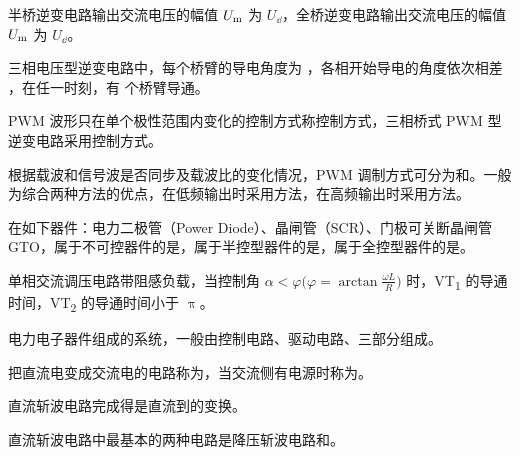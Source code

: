 \documentclass[电力电子]{subfiles}
\begin{document}
\begin{ti}
	半桥逆变电路输出交流电压的幅值 $U_{\text{m}}$ 为 $U_{\dd}$，全桥逆变电路输出交流电压的幅值 $U_{\text{m}}$ 为 $U_{\dd}$。
\end{ti}

\begin{ti}
	三相电压型逆变电路中，每个桥臂的导电角度为 ，各相开始导电的角度依次相差 ，在任一时刻，有  个桥臂导通。
\end{ti}

\begin{ti}
	PWM 波形只在单个极性范围内变化的控制方式称控制方式，三相桥式 PWM 型逆变电路采用控制方式。
\end{ti}

\begin{ti}
	根据载波和信号波是否同步及载波比的变化情况，PWM 调制方式可分为和。一般为综合两种方法的优点，在低频输出时采用方法，在高频输出时采用方法。
\end{ti}

\begin{ti}
	在如下器件：电力二极管（Power Diode）、晶闸管（SCR）、门极可关断晶闸管 GTO，属于不可控器件的是，属于半控型器件的是，属于全控型器件的是。
\end{ti}

\begin{ti}
	单相交流调压电路带阻感负载，当控制角 $\alpha < \varphi \bigl(\varphi = \arctan \frac{\omega L}{R}\bigr)$ 时，VT\textsubscript{1} 的导通时间，VT\textsubscript{2} 的导通时间小于 $\uppi$。
\end{ti}

\begin{ti}
	电力电子器件组成的系统，一般由控制电路、驱动电路、三部分组成。
\end{ti}

\begin{ti}
	把直流电变成交流电的电路称为，当交流侧有电源时称为。
\end{ti}

\begin{ti}
	直流斩波电路完成得是直流到的变换。
\end{ti}

\begin{ti}
	直流斩波电路中最基本的两种电路是降压斩波电路和。
\end{ti}
\end{document}

